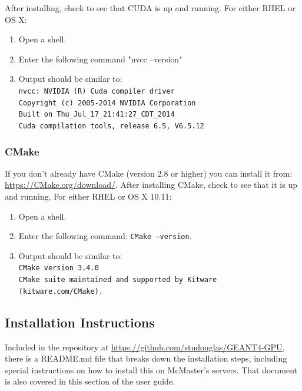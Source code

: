 \documentclass[12pt]{article}
\begin{document}
After installing, check to see that CUDA is up and running. For either RHEL or OS X:
\begin{enumerate}
\item Open a shell.
\item Enter the following command "nvcc --version"
\item Output should be similar to:\\
\texttt{nvcc: NVIDIA (R) Cuda compiler driver}\\
\texttt{Copyright (c) 2005-2014 NVIDIA Corporation}\\
\texttt{Built on Thu\_Jul\_17\_21:41:27\_CDT\_2014}\\
\texttt{Cuda compilation tools, release 6.5, V6.5.12}\\
\end{enumerate}

\subsubsection{CMake}
If you don't already have CMake (version 2.8 or higher) you can install it from: \url{https://CMake.org/download/}. After installing CMake, check to see that it is up and running. For either RHEL or OS X 10.11:
\begin{enumerate}
\item Open a shell.
\item Enter the following command: \texttt{CMake --version}.
\item Output should be similar to:\\
\texttt{CMake version 3.4.0}\\
\texttt{CMake suite maintained and supported by Kitware (kitware.com/CMake).}
\end{enumerate}

\subsection{Installation Instructions} %
Included in the repository at \url{https://github.com/studouglas/GEANT4-GPU}, there is a README.md file that breaks down the installation steps, including special instructions on how to install this on McMaster's servers. That document is also covered in this section of the user guide.
\end{document}
